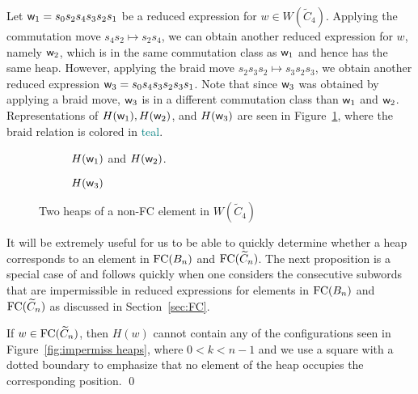 \begin{example}
Let $\mathsf{w}_1=s_0s_2s_4s_3s_2s_1$ be a reduced expression for $w \in W(\widetilde{C}_4)$. Applying the commutation move $s_4s_2\mapsto s_2s_4$, we can obtain another reduced expression for $w$, namely $\mathsf{w}_2$, which is in the same commutation class as $\mathsf{w}_1$ and hence has the same heap. However, applying the braid move $s_2s_3s_2 \mapsto s_3s_2s_3$, we obtain another reduced expression $\mathsf{w}_3=s_0s_4s_3s_2s_3s_1$. Note that since $\mathsf{w}_3$ was obtained by applying a braid move, $\mathsf{w}_3$ is in a different commutation class than $\mathsf{w}_1$ and $\mathsf{w}_2$. Representations of $H(\mathsf{w}_1), H(\mathsf{w}_2)$, and $H(\mathsf{w}_3)$ are seen in Figure~\ref{fig:not FC}, where the braid relation is colored in \textcolor{teal}{teal}.

\begin{figure}[h]
\centering
\begin{subfigure}[b]{0.3\textwidth}	
\centering
{}
\caption{$H(\mathsf{w}_1)$ and $H(\mathsf{w}_2)$.}
\end{subfigure}
\begin{subfigure}[b]{0.3\textwidth}	
\centering
{}
\caption{$H(\mathsf{w}_3)$}
\end{subfigure}
\caption{Two heaps of a non-FC element in $W(\widetilde{C}_4)$}	
\label{fig:not FC}
\end{figure}
\end{example}

It will be extremely useful for us to be able to quickly determine whether a heap corresponds to an element in $\mathrm{FC}(B_n)$ and $\mathrm{FC}(\widetilde{C}_n)$. The next proposition is a special case of \cite[Proposition 3.3]{Stembridge1996} and follows quickly when one considers the consecutive subwords that are impermissible in reduced expressions for elements in $\mathrm{FC}(B_n)$ and $\mathrm{FC}(\widetilde{C}_n)$ as discussed in Section~\ref{sec:FC}.

\begin{theorem}
If $w \in \mathrm{FC}(\widetilde{C}_n)$, then $H(w)$ cannot contain any of the configurations seen in Figure~\ref{fig:impermiss heaps}, where $0 < k < n-1$ and we use a square with a dotted boundary to emphasize that no element of the heap occupies the corresponding  position. \qed
\end{theorem}

